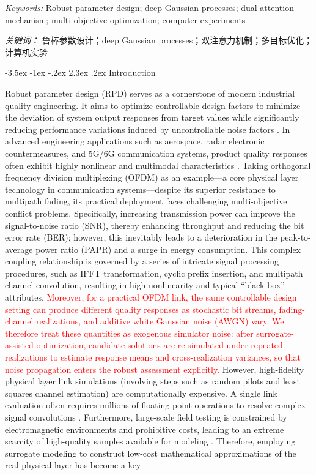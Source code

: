 \documentclass[11pt]{article}
\makeatletter
\renewcommand\section{\@startsection {section}{1}{\z@}%
                                       {-3.5ex \@plus -1ex \@minus -.2ex}%
                                       {2.3ex \@plus.2ex}%
                                       {\normalfont\fontfamily{phv}\fontsize{16}{19}\bfseries}}
\makeatother
\begin{document}
	\noindent%
	{\it Keywords:} Robust parameter design; deep Gaussian processes; dual-attention mechanism; multi-objective optimization; computer experiments

	\noindent%
	{\it 关键词：} 鲁棒参数设计；deep Gaussian processes；双注意力机制；多目标优化；计算机实验



\section{Introduction} \label{s:intro}

Robust parameter design (RPD) serves as a cornerstone of modern industrial quality engineering. It aims to optimize controllable design factors to minimize the deviation of system output responses from target values while significantly reducing performance variations induced by uncontrollable noise factors \citep{Taguchi1986, Joseph2006, Montgomery2017, Hamada2021}. In advanced engineering applications such as aerospace, radar electronic countermeasures, and 5G/6G communication systems, product quality responses often exhibit highly nonlinear and multimodal characteristics \citep{Wang2020, Liu2025, Gnanasambandam2025, SongJ2025}. Taking orthogonal frequency division multiplexing (OFDM) as an example—a core physical layer technology in communication systems—despite its superior resistance to multipath fading, its practical deployment faces challenging multi-objective conflict problems. Specifically, increasing transmission power can improve the signal-to-noise ratio (SNR), thereby enhancing throughput and reducing the bit error rate (BER); however, this inevitably leads to a deterioration in the peak-to-average power ratio (PAPR) and a surge in energy consumption. This complex coupling relationship is governed by a series of intricate signal processing procedures, such as IFFT transformation, cyclic prefix insertion, and multipath channel convolution, resulting in high nonlinearity and typical “black-box” attributes. \textcolor{red}{Moreover, for a practical OFDM link, the same controllable design setting can produce different quality responses as stochastic bit streams, fading-channel realizations, and additive white Gaussian noise (AWGN) vary. We therefore treat these quantities as exogenous simulator noise: after surrogate-assisted optimization, candidate solutions are re-simulated under repeated realizations to estimate response means and cross-realization variances, so that noise propagation enters the robust assessment explicitly.} However, high-fidelity physical layer link simulations (involving steps such as random pilots and least squares channel estimation) are computationally expensive. A single link evaluation often requires millions of floating-point operations to resolve complex signal convolutions \citep{Song2025}. Furthermore, large-scale field testing is constrained by electromagnetic environments and prohibitive costs, leading to an extreme scarcity of high-quality samples available for modeling \citep{Ming2022, Sauer2022, Ghandwani2025}. Therefore, employing surrogate modeling to construct low-cost mathematical approximations of the real physical layer has become a key 
\end{document}
